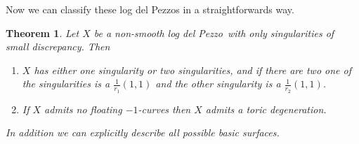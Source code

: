 \documentclass[12pt]{amsbook}
\theoremstyle{plain}
\newtheorem{thm}{Theorem}[section]
\newcommand{\ldp}{log del Pezzo}
\begin{document}
Now we can classify these log del Pezzos in a straightforwards way. 
\begin{thm}\label{ThmOnSing}
Let $X$ be a non-smooth \ldp\ with only singularities of small discrepancy. Then 
\begin{enumerate}
\item\label{thm38i}
$X$ has either one singularity or two singularities, and if there are two one of the singularities is a $\frac{1}{r_1}(1,1)$ and the other singularity is a $\frac{1}{r_2}(1,1)$.
\item\label{thm38ii}
If $X$ admits no floating $-1$-curves then $X$ admits a toric degeneration. %
\end{enumerate}
In addition we can explicitly describe all possible basic surfaces.
\end{thm}
\end{document}
